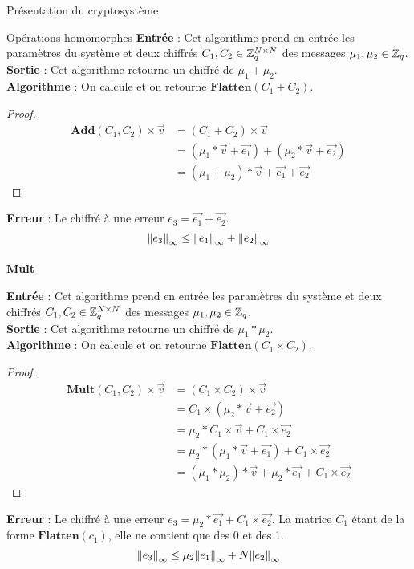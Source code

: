 \begin{section}{Présentation du cryptosystème}
\begin{subsection}{Opérations homomorphes}
	\textbf{Entrée} : Cet algorithme prend en entrée les paramètres du système et deux chiffrés $C_1, C_2 \in \mathbb{Z}_q^{N \times N}$ des messages $\mu_1, \mu_2 \in \mathbb{Z}_q$.\\
	\textbf{Sortie} : Cet algorithme retourne un chiffré de $\mu_1 + \mu_2$.\\
	\textbf{Algorithme} : On calcule et on retourne $\textbf{Flatten}(C_1 + C_2)$.
	\begin{proof}
	\begin{align*}
	\textbf{Add}(C_1, C_2) \times \vec{v} &= (C_1 + C_2) \times \vec{v} \\
	&= (\mu_1 * \vec{v} + \vec{e_1}) + (\mu_2 * \vec{v} + \vec{e_2}) \\
	&= (\mu_1 + \mu_2) * \vec{v} + \vec{e_1} + \vec{e_2}
	\end{align*}
	\end{proof}
\textbf{Erreur} : Le chiffré à une erreur $e_3 = \vec{e_1} + \vec{e_2}$.
\[{\|e_3\|}_{\infty} \leq {\|e_1\|}_{\infty} + {\|e_2\|}_{\infty}\]
	\paragraph{}
	\textbf{Mult}
	\flushleft
	
	\textbf{Entrée} : Cet algorithme prend en entrée les paramètres du système et deux chiffrés $C_1, C_2 \in \mathbb{Z}_q^{N \times N}$ des messages $\mu_1, \mu_2 \in \mathbb{Z}_q$.\\
	\textbf{Sortie} : Cet algorithme retourne un chiffré de $\mu_1 * \mu_2$. \\
	\textbf{Algorithme} : On calcule et on retourne $\textbf{Flatten}(C_1 \times C_2)$.
	\begin{proof}
	\begin{align*}
	\textbf{Mult}(C_1, C_2) \times \vec{v} &= (C_1 \times C_2) \times \vec{v} \\
	&= C_1 \times (\mu_2 * \vec{v} + \vec{e_2}) \\
	&= \mu_2 * C_1 \times \vec{v} + C_1 \times \vec{e_2} \\
	&= \mu_2 * (\mu_1 * \vec{v} + \vec{e_1}) + C_1 \times \vec{e_2} \\
	&= (\mu_1 * \mu_2) * \vec{v} + \mu_2 * \vec{e_1} + C_1 \times \vec{e_2}
	\end{align*}
	\end{proof}
	\textbf{Erreur} : Le chiffré à une erreur $e_3 = \mu_2 * \vec{e_1} + C_1 \times \vec{e_2}$. La matrice $C_1$ étant de la forme $\textbf{Flatten}(c_1)$, elle ne contient que des 0 et des 1. 
\[{\|e_3\|}_{\infty} \leq\mu_2 {\|e_1\|}_{\infty} + N {\|e_2\|}_{\infty} \]

\end{subsection}
\end{section}
